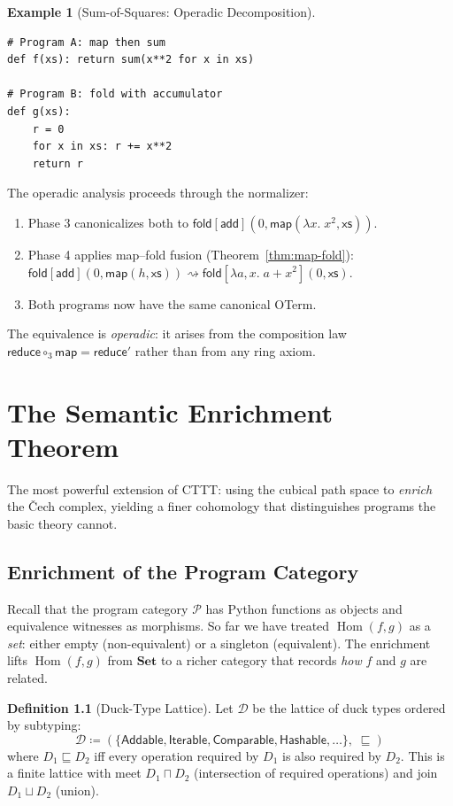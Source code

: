 \documentclass[11pt,a4paper]{report}
\theoremstyle{definition}
\newtheorem{definition}{Definition}[chapter]
\newtheorem{example}[definition]{Example}
\theoremstyle{plain}
\newcommand{\Set}{\mathbf{Set}}
\newcommand{\fold}{\mathsf{fold}}
\DeclareMathOperator{\Hom}{Hom}
\begin{document}
\begin{example}[Sum-of-Squares: Operadic Decomposition]
\begin{lstlisting}
# Program A: map then sum
def f(xs): return sum(x**2 for x in xs)

# Program B: fold with accumulator
def g(xs):
    r = 0
    for x in xs: r += x**2
    return r
\end{lstlisting}

The operadic analysis proceeds through the normalizer:
\begin{enumerate}
  \item Phase 3 canonicalizes both to
    $\fold[\mathsf{add}](0, \mathsf{map}(\lambda x.\; x^2, \mathsf{xs}))$.
  \item Phase 4 applies map--fold fusion (Theorem~\ref{thm:map-fold}):
    $\fold[\mathsf{add}](0, \mathsf{map}(h, \mathsf{xs}))
    \rightsquigarrow \fold[\lambda a,x.\; a + x^2](0, \mathsf{xs})$.
  \item Both programs now have the same canonical OTerm.
\end{enumerate}
The equivalence is \emph{operadic}: it arises from the composition law
$\mathsf{reduce} \circ_3 \mathsf{map} = \mathsf{reduce}'$ rather
than from any ring axiom.
\end{example}


\chapter{The Semantic Enrichment Theorem}
\label{ch:enrichment}

The most powerful extension of CTTT: using the cubical path space
to \emph{enrich} the \v{C}ech complex, yielding a finer cohomology
that distinguishes programs the basic theory cannot.

\section{Enrichment of the Program Category}

Recall that the program category $\mathcal{P}$ has Python functions as
objects and equivalence witnesses as morphisms.  So far we have treated
$\Hom(f,g)$ as a \emph{set}: either empty (non-equivalent) or a
singleton (equivalent).  The enrichment lifts $\Hom(f,g)$ from
$\Set$ to a richer category that records \emph{how} $f$ and $g$ are
related.

\begin{definition}[Duck-Type Lattice]
\label{def:duck-lattice}
Let $\mathcal{D}$ be the lattice of duck types ordered by subtyping:
\[
  \mathcal{D} \coloneqq (\{\mathsf{Addable}, \mathsf{Iterable},
    \mathsf{Comparable}, \mathsf{Hashable}, \ldots\},\; \sqsubseteq)
\]
where $D_1 \sqsubseteq D_2$ iff every operation required by $D_1$ is
also required by $D_2$.  This is a finite lattice with meet
$D_1 \sqcap D_2$ (intersection of required operations) and join
$D_1 \sqcup D_2$ (union).
\end{definition}
\end{document}
